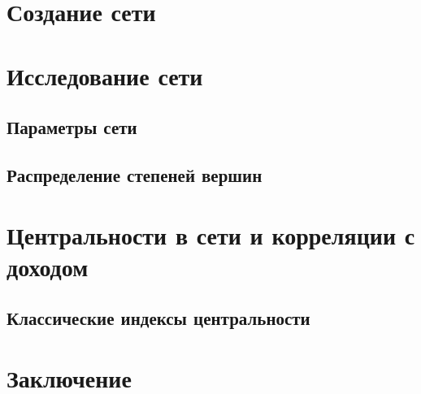 \documentclass[a4paper,14pt]{article}
\begin{document}
  \section{Создание сети}

  \section{Исследование сети}

  \subsection{Параметры сети}

  \subsection{Распределение степеней вершин}

  \subsection{}

  \section{Центральности в сети и корреляции с доходом}

  \subsection{Классические индексы центральности}

  \section{Заключение}

	
\end{document}
